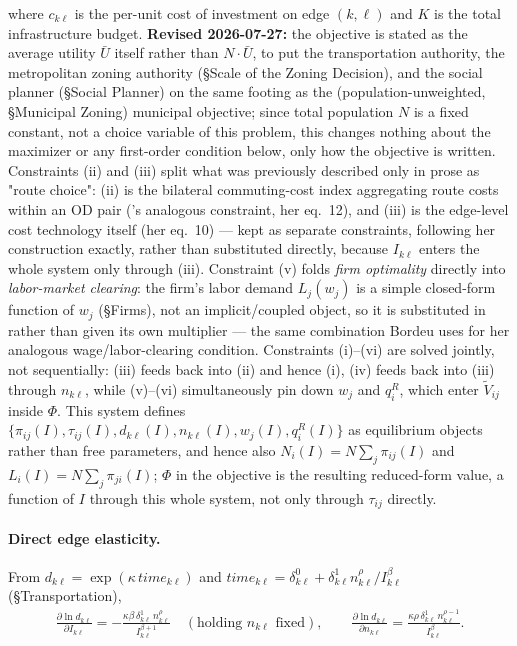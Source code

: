 \documentclass[12pt, a4paper]{article}
\theoremstyle{definition}
\theoremstyle{remark}
\begin{document}
where $c_{k\ell}$ is the per-unit cost of investment on edge $(k,\ell)$ and $K$ is the total infrastructure budget. \textbf{Revised 2026-07-27:} the objective is stated as the average utility $\bar U$ itself rather than $N\cdot\bar U$, to put the transportation authority, the metropolitan zoning authority (\S Scale of the Zoning Decision), and the social planner (\S Social Planner) on the same footing as the (population-unweighted, \S Municipal Zoning) municipal objective; since total population $N$ is a fixed constant, not a choice variable of this problem, this changes nothing about the maximizer or any first-order condition below, only how the objective is written. Constraints (ii) and (iii) split what was previously described only in prose as "route choice": (ii) is the bilateral commuting-cost index aggregating route costs within an OD pair (\citealt{Bordeu2026-df}'s analogous constraint, her eq.~12), and (iii) is the edge-level cost technology itself (her eq.~10) — kept as separate constraints, following her construction exactly, rather than substituted directly, because $I_{k\ell}$ enters the whole system only through (iii). Constraint (v) folds \emph{firm optimality} directly into \emph{labor-market clearing}: the firm's labor demand $L_j(w_j)$ is a simple closed-form function of $w_j$ (\S Firms), not an implicit/coupled object, so it is substituted in rather than given its own multiplier — the same combination Bordeu uses for her analogous wage/labor-clearing condition. Constraints (i)--(vi) are solved jointly, not sequentially: (iii) feeds back into (ii) and hence (i), (iv) feeds back into (iii) through $n_{k\ell}$, while (v)--(vi) simultaneously pin down $w_j$ and $q_i^R$, which enter $\tilde V_{ij}$ inside $\Phi$. This system defines $\{\pi_{ij}(I), \tau_{ij}(I), d_{k\ell}(I), n_{k\ell}(I), w_j(I), q_i^R(I)\}$ as equilibrium objects rather than free parameters, and hence also $N_i(I)=N\sum_j\pi_{ij}(I)$ and $L_i(I)=N\sum_j\pi_{ji}(I)$; $\Phi$ in the objective is the resulting reduced-form value, a function of $I$ through this whole system, not only through $\tau_{ij}$ directly.

\paragraph{Direct edge elasticity.} From $d_{k\ell}=\exp(\kappa\, time_{k\ell})$ and $time_{k\ell}=\delta_{k\ell}^0+\delta_{k\ell}^1 n_{k\ell}^\rho/I_{k\ell}^\beta$ (\S Transportation),
\begin{align}
    \label{eq:d-elasticity}
    \frac{\partial \ln d_{k\ell}}{\partial I_{k\ell}} = -\frac{\kappa\beta\,\delta_{k\ell}^1\,n_{k\ell}^\rho}{I_{k\ell}^{\beta+1}}\quad(\text{holding }n_{k\ell}\text{ fixed}), \qquad
    \frac{\partial \ln d_{k\ell}}{\partial n_{k\ell}} = \frac{\kappa\rho\,\delta_{k\ell}^1\,n_{k\ell}^{\rho-1}}{I_{k\ell}^\beta}.
\end{align}
\end{document}
